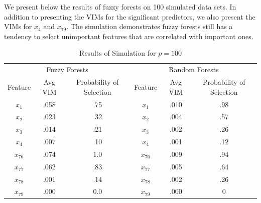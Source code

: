 \documentclass[article,shortnames]{jss}
\begin{document}
We present below the results of fuzzy forests on 100 simulated data sets.  In addition to presenting the VIMs
for the significant predictors, we also present the VIMs for $x_{4}$ and $x_{79}$.  The simulation 
demonstrates fuzzy forests still has a tendency to select unimportant features that are correlated with important 
ones.   
\begin{table}
\centering
\caption{Results of Simulation for $p=100$}
\begin{tabular}[bc]{c c c | c c c}
\hline
\multicolumn{3}{c|}{Fuzzy Forests} & \multicolumn{3}{c}{Random Forests}\\
Feature&Avg VIM& Probability of Selection & Feature & Avg VIM & Probability of Selection\\
\hline
$x_{1}$  & .058 &  .75  & $x_{1}$ & .010 & .98\\
$x_{2}$  & .023 &  .32 & $x_{2}$ & .004 & .57\\
$x_{3}$  & .014 &  .21 & $x_{3}$ & .002 & .26\\
$x_{4}$ & .007 &  .10 & $x_{4}$ & .001 & .12\\
$x_{76}$ & .074 & 1.0 & $x_{76}$ & .009 & .94\\
$x_{77}$ & .062 & .83 & $x_{77}$ & .005 & .64\\
$x_{78}$ & .001 & .14 & $x_{78}$ & .002 & .26\\
$x_{79}$ & .000 & 0.0 & $x_{79}$ & .000 & 0
\end{tabular}
\end{table}
\end{document}
